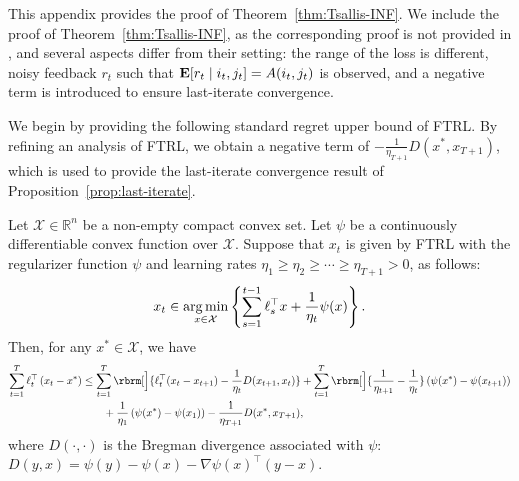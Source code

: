 This appendix provides the proof of Theorem~\ref{thm:Tsallis-INF}.
We include the proof of Theorem~\ref{thm:Tsallis-INF},  
as the corresponding proof is not provided in \citet{zimmert2021tsallis},  
and several aspects differ from their setting:  
the range of the loss is different,  
noisy feedback $r_t$ such that $\operatorname*{\mathbf{E}}[r_t \mid i_t, j_t] = A(i_t, j_t)$ is observed,  
and a negative term is introduced to ensure last-iterate convergence.

We begin by providing the following standard regret upper bound of FTRL.
By refining an analysis of FTRL,
we obtain a negative term of $- \frac{1}{\eta_{T+1}} D (x^*, x_{T+1} )$,
which is used to provide the last-iterate convergence result of  Proposition~\ref{prop:last-iterate}.
\begin{lemma}\label{lem:ftrl_bound}
    Let $\mathcal{X} \in \mathbb{R}^n$ be a non-empty compact convex set. 
    Let $\psi$ be a continuously differentiable convex function over $\mathcal{X}$.
    Suppose that $x_t$ is given by FTRL with the regularizer function $\psi$ 
    and learning rates $\eta_1 \ge \eta_2 \ge \cdots \ge \eta_{T+1} > 0$,
    as follows:
    \begin{align}
        \label{eq:defFTRL}
        x_{t} \in \operatorname*{arg\,min}_{ x \in \mathcal{X} } \left\{ 
        \sum_{s=1}^{t-1} \ell_s^\top x
        +
        \frac{1}{\eta_t} \psi(x)
        \right\}.
    \end{align}
    Then,
    for any $x^* \in \mathcal{X}$,
    we have
    \begin{align}
        \sum_{t=1}^T  \ell_t^\top \left( x_t - x^* \right)
        &
        \le
        \sum_{t=1}^T
        \rbrm[\Big]{
            \ell_t^\top (x_t - x_{t+1})
            -
            \frac{1}{\eta_t} D(x_{t+1}, x_t)
        }
        +
        \sum_{t=1}^T
            \rbrm[\Big]{
            \frac{1}{\eta_{t+1}}
            -
            \frac{1}{\eta_{t}}
            }
            \left(
            \psi(x^*)
            -
            \psi( x_{t+1} )
            \right)
        \nonumber
        \\
        &
        \quad
        \quad
        +
        \frac{1}{\eta_1} \left(
        \psi(x^*)
        -
        \psi(x_1)
        \right)
        -
        \frac{1}{\eta_{T+1}}
        D(x^*, x_{T+1}),
        \label{eq:bound_FTRL_with_negative}
    \end{align}
    where $D(\cdot, \cdot )$ is the Bregman divergence associated with $\psi$:
    $D(y, x) = \psi(y) - \psi(x) - \nabla \psi(x)^\top (y - x)$.
\end{lemma}
